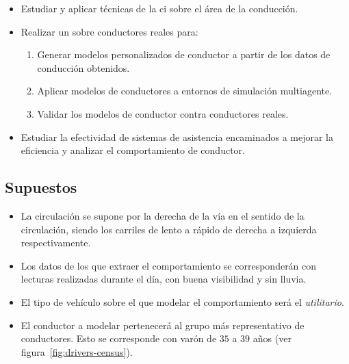 \begin{itemize}
	\item Estudiar y aplicar técnicas de la \gls{ci} sobre el área de la conducción.
	\item Realizar un  sobre conductores reales para:
	\begin{enumerate}
		\item Generar modelos personalizados de conductor a partir de los datos de conducción obtenidos.
		\item Aplicar modelos de conductores a entornos de simulación multiagente.
		\item Validar los modelos de conductor contra conductores reales.
	\end{enumerate}
	\item Estudiar la efectividad de sistemas de asistencia encaminados a mejorar la eficiencia y analizar el comportamiento de conductor.
\end{itemize}

\subsection{Supuestos}

\begin{itemize}
	\item La circulación se supone por la derecha de la vía en el sentido de la circulación, siendo los carriles de lento a rápido de derecha a izquierda respectivamente.
	\item Los datos de los que extraer el comportamiento se corresponderán con lecturas realizadas durante el día, con buena visibilidad y sin lluvia.
	\item El tipo de vehículo sobre el que modelar el comportamiento será el \textit{utilitario}.
	\item El conductor a modelar pertenecerá al grupo más representativo de conductores. Esto se corresponde con varón de $35$ a $39$ años (ver figura~\ref{fig:drivers-census}).
\end{itemize}

